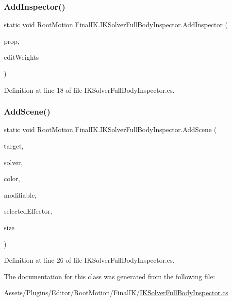 \subsubsection{\texorpdfstring{Add\+Inspector()}{AddInspector()}}
{\footnotesize\ttfamily static void Root\+Motion.\+Final\+I\+K.\+I\+K\+Solver\+Full\+Body\+Inspector.\+Add\+Inspector (\begin{DoxyParamCaption}\item[{Serialized\+Property}]{prop,  }\item[{bool}]{edit\+Weights }\end{DoxyParamCaption})\hspace{0.3cm}{\ttfamily [static]}}



Definition at line 18 of file I\+K\+Solver\+Full\+Body\+Inspector.\+cs.

\mbox{\label{class_root_motion_1_1_final_i_k_1_1_i_k_solver_full_body_inspector_a25e84c1c802350a48d6c4990bafbfefc}} 
\subsubsection{\texorpdfstring{Add\+Scene()}{AddScene()}}
{\footnotesize\ttfamily static void Root\+Motion.\+Final\+I\+K.\+I\+K\+Solver\+Full\+Body\+Inspector.\+Add\+Scene (\begin{DoxyParamCaption}\item[{\mbox{\hyperlink{_triangles_8cs_aef19bab18b9814edeef255c43e4f6bbc}{Unity\+Engine.\+Object}}}]{target,  }\item[{I\+K\+Solver\+Full\+Body}]{solver,  }\item[{Color}]{color,  }\item[{bool}]{modifiable,  }\item[{ref int}]{selected\+Effector,  }\item[{float}]{size }\end{DoxyParamCaption})\hspace{0.3cm}{\ttfamily [static]}}



Definition at line 26 of file I\+K\+Solver\+Full\+Body\+Inspector.\+cs.



The documentation for this class was generated from the following file\+:\begin{DoxyCompactItemize}
\item 
Assets/\+Plugins/\+Editor/\+Root\+Motion/\+Final\+I\+K/\mbox{\hyperlink{_i_k_solver_full_body_inspector_8cs}{I\+K\+Solver\+Full\+Body\+Inspector.\+cs}}\end{DoxyCompactItemize}

